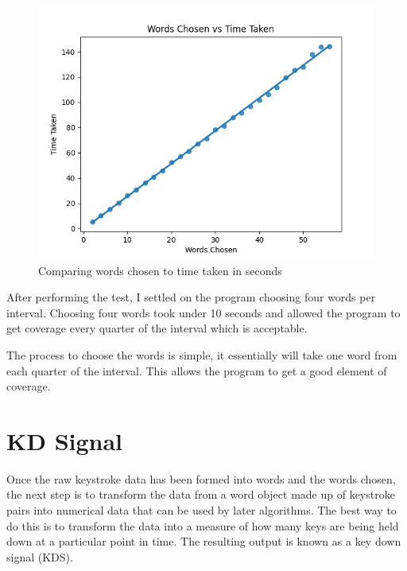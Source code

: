 \documentclass[10pt,a4paper]{report}
\begin{document}
\begin{figure}
	\centering
	\includegraphics[scale=0.70]{WordsChosenVsTime}
	\caption{Comparing words chosen to time taken in seconds}
	\label{fig:WordsvsTime}
\end{figure}

After performing the test, I settled on the program choosing four words per interval. Choosing four words took under 10 seconds and allowed the program to get coverage every quarter of the interval which is acceptable.

The process to choose the words is simple, it essentially will take one word from each quarter of the interval. This allows the program to get a good element of coverage.

\section{KD Signal}
Once the raw keystroke data has been formed into words and the words chosen, the next step is to transform the data from a word object made up of keystroke pairs into numerical data that can be used by later algorithms. The best way to do this is to transform the data into a measure of how many keys are being held down at a particular point in time. The resulting output is known as a key down signal (KDS). \cite{ToosiRamin2021Taok}
\end{document}
